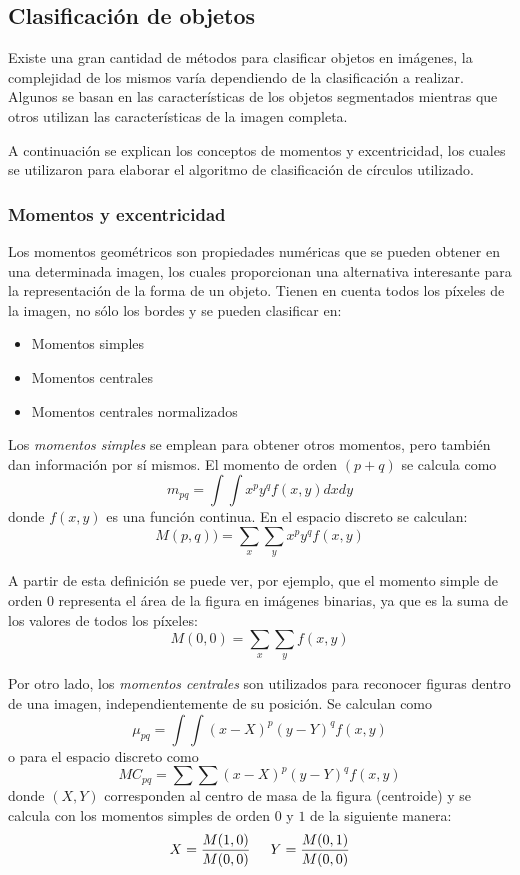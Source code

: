 \subsection{Clasificación de objetos}

Existe una gran cantidad de métodos para clasificar objetos en imágenes, la complejidad de los mismos varía dependiendo de la clasificación a realizar. Algunos se basan en las características de los objetos segmentados mientras que otros utilizan las características de la imagen completa.

A continuación se explican los conceptos de momentos y excentricidad, los cuales se utilizaron para elaborar el algoritmo de clasificación de círculos utilizado.

\subsubsection{Momentos y excentricidad \cite{imageMoments}}

Los momentos geométricos son propiedades numéricas que se pueden obtener en una determinada imagen, los cuales proporcionan una alternativa interesante para la representación de la forma de un objeto. Tienen en cuenta todos los píxeles de la imagen, no sólo los bordes y se pueden clasificar en:

\begin{itemize}
\item Momentos simples
\item Momentos centrales
\item Momentos centrales normalizados
\end{itemize}

Los \textit{momentos simples} se emplean para obtener otros momentos, pero también dan información por sí mismos. El momento de orden $(p+q)$ se calcula como $$m_{pq}={\int}{\int}x^py^qf(x,y)dxdy$$ donde $f(x,y)$ es una función continua. En el espacio discreto se calculan: $$M(p,q))={\sum}_x{\sum}_yx^py^qf(x,y)$$

A partir de esta definición se puede ver, por ejemplo, que el momento simple de orden 0 representa el área de la figura en imágenes binarias, ya que es la suma de los valores de todos los píxeles: $$M(0,0) = {\sum}_x{\sum}_yf(x,y)$$

Por otro lado, los \textit{momentos centrales} son utilizados para reconocer figuras dentro de una imagen, independientemente de su posición. Se calculan como $${\mu}_{pq}={\int}{\int}(x-X)^p(y-Y)^qf(x,y)$$ o para el espacio discreto como $${MC}_{pq}={\sum}{\sum}(x-X)^p(y-Y)^qf(x,y)$$ donde $(X,Y)$ corresponden al centro de masa de la figura (centroide) y se calcula con los momentos simples de orden $0$ y $1$ de la siguiente manera: $$X=\frac{M(1,0)}{M(0,0)} \hspace{5 mm} Y=\frac{M(0,1)}{M(0,0)}$$


